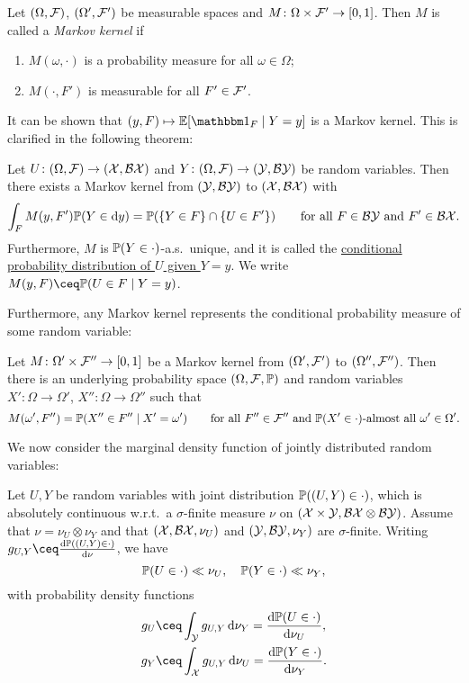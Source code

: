 \begin{definition}
	Let $(\Omega, \mathcal F)$, $(\Omega', \mathcal F')$ be measurable spaces and $M \colon \Omega \times \mathcal F' \to [0, 1]$. Then $M$ is called a \emph{Markov kernel} if
	\begin{enumerate}
		\item $M(\omega, \cdot)$ is a probability measure for all $\omega \in \Omega$;
		\item $M(\cdot, F')$ is measurable for all $F' \in \mathcal F'$. 
	\end{enumerate}
\end{definition}

It can be shown that $(y, F) \mapsto \EE[\ind_F \mid Y= y]$ is a Markov kernel. This is clarified in the following theorem:

\begin{theorem}
Let $U \colon (\Omega, \mathcal F) \to (\mathcal X, \mathcal B\mathcal X)$ and $Y \colon (\Omega, \mathcal F) \to (\mathcal Y, \mathcal B\mathcal Y)$ be random variables. Then there exists a Markov kernel from $(\mathcal Y, \mathcal B\mathcal Y)$ to $(\mathcal X, \mathcal B\mathcal X)$ with
\[
\int_F M(y, F') \mathbb P(Y \in \dd{y}) = \mathbb P(\qty{Y\in F} \cap \qty{U \in F'}) \qquad \text{for all $F \in \mathcal B\mathcal Y$ and $F' \in \mathcal B\mathcal X$}. 
\]
Furthermore, $M$ is $\mathbb P(Y \in \cdot)$-a.s.\ unique, and it is called the \uline{conditional probability distribution of $U$ given $Y = y$}. We write $M(y, F) \ceq \PP(U \in F \mid Y = y)$. 
\end{theorem}

Furthermore, any Markov kernel represents the conditional probability measure of some random variable:
\begin{theorem}
	Let $M \colon \Omega' \times \mathcal F'' \to [0, 1]$ be a Markov kernel from $(\Omega', \mathcal F')$ to $(\Omega'', \mathcal F'')$. Then there is an underlying probability space $(\Omega, \mathcal F, \mathbb P)$ and random variables $X' \colon \Omega \to \Omega'$, $X'' \colon \Omega \to \Omega''$ such that
	\[
	M(\omega', F'') = \mathbb P(X'' \in F'' \mid X' = \omega') \qquad\text{for all $F'' \in \mathcal F''$ and $\mathbb P(X' \in \cdot)$-almost all $\omega' \in \Omega'$}. 
	\]
\end{theorem}

We now consider the marginal density function of jointly distributed random variables:
\begin{lemma}
	Let $U, Y$ be random variables with joint distribution $\mathbb P((U, Y) \in \cdot)$, which is absolutely continuous w.r.t.\ a $\sigma$-finite measure $\nu$ on $(\mathcal X \times\mathcal Y, \mathcal B\mathcal X \otimes \mathcal B\mathcal Y)$. Assume that $\nu = \nu_U \otimes \nu_Y$ and that $(\mathcal X, \mathcal B\mathcal X, \nu_U)$ and $(\mathcal Y, \mathcal B\mathcal Y, \nu_Y)$ are $\sigma$-finite. Writing $g_{U, Y} \ceq \frac{\dd \PP((U, Y) \in \cdot)}{\dd\nu}$, we have
	\[
	\mathbb P(U \in \cdot) \ll \nu_U, \quad \mathbb P(Y \in \cdot) \ll \nu_Y, 
	\]
	with probability density functions
	\begin{align*}
		g_U &\ceq \int_\YY g_{U, Y} \dd{\nu_Y} = \frac{\dd \PP(U \in \cdot)}{\dd \nu_U}, \\
		g_Y &\ceq \int_\XX g_{U, Y} \dd{\nu_U} = \frac{\dd \PP(Y \in \cdot)}{\dd \nu_Y}.
	\end{align*}
\end{lemma}

